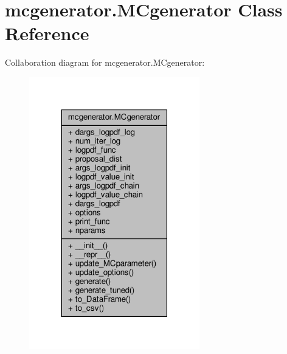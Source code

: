 \hypertarget{classmcgenerator_1_1MCgenerator}{}\section{mcgenerator.\+M\+Cgenerator Class Reference}
\label{classmcgenerator_1_1MCgenerator}


Collaboration diagram for mcgenerator.\+M\+Cgenerator\+:\nopagebreak
\begin{figure}[H]
\begin{center}
\leavevmode
\includegraphics[width=210pt]{d5/d4c/classmcgenerator_1_1MCgenerator__coll__graph}
\end{center}
\end{figure}
